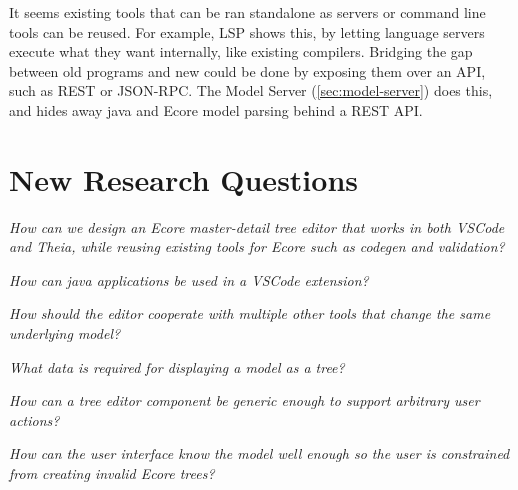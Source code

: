 It seems existing tools that can be ran standalone as servers or command line tools can be reused.
For example, \gls{LSP} shows this, by letting language servers execute what they want internally, like existing compilers.
Bridging the gap between old programs and new could be done by exposing them over an \gls{API}, such as \gls{REST} or \gls{JSON-RPC}. The Model Server (\cref{sec:model-server}) does this, and hides away java and \gls{Ecore} model parsing behind a \gls{REST} \acrshort{API}.


\section{New Research Questions}

\begin{questions}[leftmargin=1cm,resume]
  \item \emph{How can we design an Ecore master-detail tree editor that works in both VSCode and Theia, while reusing existing tools for Ecore such as codegen and validation?}\label{rq:21}
  \begin{questions}
    \item \emph{How can java applications be used in a VSCode extension?}\label{rq:22}
    \item \emph{How should the editor cooperate with multiple other tools that change the same underlying model?}\label{rq:23}
    \item \emph{What data is required for displaying a model as a tree?}\label{rq:24}
    \item \emph{How can a tree editor component be generic enough to support arbitrary user actions?}\label{rq:25}
    \item \emph{How can the user interface know the model well enough so the user is constrained from creating invalid Ecore trees?}\label{rq:26}
  \end{questions}
\end{questions}
